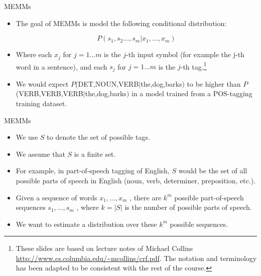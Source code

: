 \documentclass[handout]{beamer}
\begin{document}
\begin{frame}{MEMMs}
\begin{scriptsize}
\begin{itemize}


 \item The goal of MEMMs is  model the following conditional distribution:
 
 \begin{displaymath}
  P(s_1,s_2 \dots, s_m | x_1, \dots, x_m)
 \end{displaymath}

 \item Where each $x_j$ for $j = 1 \dots m$ is the $j$-th input symbol (for example the j-th word in a sentence), and each $s_j$ for $j = 1 \dots m$ is the $j$-th tag.\footnote{These slides are based on lecture notes of Michael Collins \url{http://www.cs.columbia.edu/~mcollins/crf.pdf}. The notation and terminology has been adapted to be consistent with the rest of the course.}

\item We would expect $P$(DET,NOUN,VERB$|$the,dog,barks$)$ to be higher than $P$(VERB,VERB,VERB$|$the,dog,barks$)$ in a model trained from a POS-tagging training dataset.
 
\end{itemize}


\end{scriptsize}
\end{frame}


\begin{frame}{MEMMs}
\begin{scriptsize}
\begin{itemize}
\item We use $S$ to denote the set of possible tags.
\item We assume that $S$ is a finite set. 
 \item For example, in part-of-speech tagging of English, $S$ would be the set of all possible parts of speech in English (noun, verb, determiner, preposition, etc.).
 \item Given a sequence of words $x_1, \dots, x_m$ , there are $k^m$ possible part-of-speech sequences $s_1, \dots, s_m$ , where $k = |S|$ is the number of possible parts of speech.
 \item We want to estimate a distribution over these $k^m$ possible sequences.
\end{itemize}


\end{scriptsize}
\end{frame}
\end{document}
